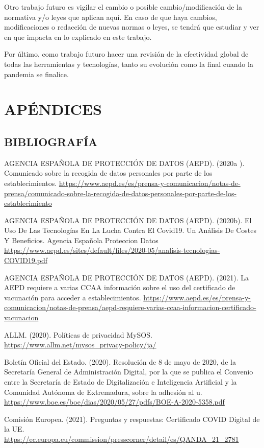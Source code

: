 \documentclass[11pt,a4paper,spanish]{article}
\begin{document}
Otro trabajo futuro es vigilar el cambio o posible cambio/modificación de la normativa y/o leyes que aplican aquí. En caso de que haya cambios, modificaciones o redacción de nuevas normas o leyes, se tendrá que estudiar y ver en que impacta en lo explicado en este trabajo.

Por último, como trabajo futuro hacer una revisión de la efectividad global de todas las herramientas y tecnologías, tanto su evolución como la final cuando la pandemia se finalice.

\section{APÉNDICES}
\subsection{BIBLIOGRAFÍA}

AGENCIA ESPAÑOLA DE PROTECCIÓN DE DATOS (AEPD). (2020a                                                                                      ). Comunicado sobre la recogida de datos personales por parte de los establecimientos. \url{https://www.aepd.es/es/prensa-y-comunicacion/notas-de-prensa/comunicado-sobre-la-recogida-de-datos-personales-por-parte-de-los-establecimiento}

AGENCIA ESPAÑOLA DE PROTECCIÓN DE DATOS (AEPD). (2020b). El Uso De Las Tecnologías En La Lucha Contra El Covid19. Un Análisis De Costes Y Beneficios. Agencia Española Proteccion Datos \url{https://www.aepd.es/sites/default/files/2020-05/analisis-tecnologias-COVID19.pdf}

AGENCIA ESPAÑOLA DE PROTECCIÓN DE DATOS (AEPD). (2021). La AEPD requiere a varias CCAA información sobre el uso del certificado de vacunación para acceder a establecimientos. \url{https://www.aepd.es/es/prensa-y-comunicacion/notas-de-prensa/aepd-requiere-varias-ccaa-informacion-certificado-vacunacion}

ALLM. (2020). Políticas de privacidad MySOS. \url{https://www.allm.net/mysos_privacy-policy/ja/}

Boletín Oficial del Estado. (2020). Resolución de 8 de mayo de 2020, de la Secretaría General de Administración Digital, por la que se publica el Convenio entre la Secretaría de Estado de Digitalización e Inteligencia Artificial y la Comunidad Autónoma de Extremadura, sobre la adhesión al u. \url{https://www.boe.es/boe/dias/2020/05/27/pdfs/BOE-A-2020-5358.pdf}

Comisión Europea. (2021). Preguntas y respuestas: Certificado COVID Digital de la UE. \url{https://ec.europa.eu/commission/presscorner/detail/es/QANDA_21_2781}
\end{document}
